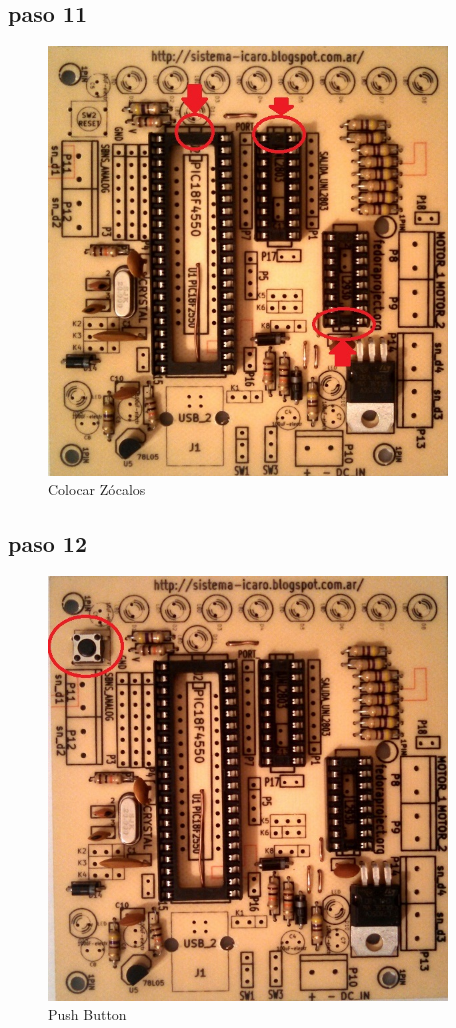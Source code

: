 \documentclass[letterpaper,10pt,english]{sphinxmanual}
\begin{document}
\subsection{paso 11}
\label{np07:paso-11}\begin{figure}[htbp]
\centering
\capstart

\includegraphics[width=300pt]{11b.jpg}
\caption{Colocar Zócalos}\end{figure}
\newpage

\subsection{paso 12}
\label{np07:paso-12}\begin{figure}[htbp]
\centering
\capstart

\includegraphics[width=300pt]{12b.jpg}
\caption{Push Button}\end{figure}
\newpage
\end{document}
